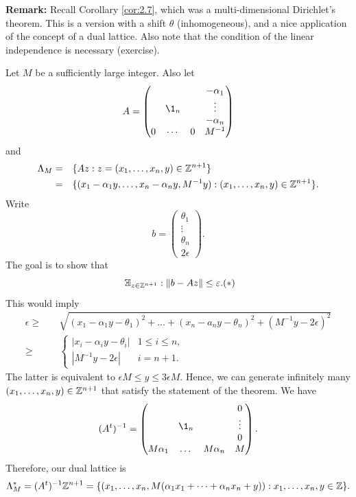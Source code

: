 \documentclass{Vorlesungstemplate_English} %
\begin{document}
\noindent \textbf{Remark:} Recall Corollary \ref{cor:2.7}, which was a multi-dimensional Dirichlet's theorem. This is a version with a shift $\theta$ (inhomogeneous), and a nice application of the concept of a dual lattice. Also note that the condition of the linear independence is necessary (exercise).
\begin{pf}
  Let $M$ be a sufficiently large integer. Also let
  \[ A = \begin{pmatrix}
    & & & -\alpha_1 \\
    & \1_n & & \vdots \\
    & & & -\alpha_n \\
    0 & \cdots & 0 & M^{-1}
  \end{pmatrix}\]
  and
  \begin{align*} \Lambda_M = \quad & \{ Az: z = (x_1, \dots, x_n,y) \in \mathbb{Z}^{n+1}\} \\
  = \quad & \{ (x_1-\alpha_1y, \dots, x_n-\alpha_ny, M^{-1}y): (x_1, \dots, x_n, y) \in \mathbb{Z}^{n+1}\}.\end{align*}
  Write
  \[ b = \begin{pmatrix}
    \theta_1 \\
    \vdots \\
    \theta_n \\
    2\epsilon
  \end{pmatrix}.\]
  The goal is to show that \[\exists_{z \in \Z^{n+1}}: \|b-Az\| \leq \epsilon. \hfill (*)\]
  This would imply
  \begin{align*} \epsilon \geq \quad & \sqrt{(x_1-\alpha_1y-\theta_1)^2 + \dots + (x_n-a_ny-\theta_n)^2 + (M^{-1}y-2\epsilon)^2} \\
   \geq \quad & \begin{cases}
    |x_i-\alpha_iy-\theta_i| & 1 \leq i \leq n, \\
    |M^{-1}y-2\epsilon| & i=n+1.
  \end{cases}\end{align*}
  The latter is equivalent to $\epsilon M \leq y \leq 3\epsilon M$. Hence, we can generate infinitely many $(x_1, \dots, x_n, y) \in \mathbb{Z}^{n+1}$ that satisfy the statement of the theorem. We have
  \[ (A^t)^{-1} = \begin{pmatrix}
    & & & 0 \\
    & \1_n & & \vdots \\
    & & & 0 \\
    M\alpha_1 & \dots & M\alpha_n & M
  \end{pmatrix}.\]
  Therefore, our dual lattice is
  \[ \Lambda_M^* = (A^t)^{-1}\mathbb{Z}^{n+1} = \{ (x_1, \dots, x_n, M(\alpha_1x_1+\dots+\alpha_nx_n+y)): x_1, \dots, x_n,y \in \mathbb{Z}\}.\]

\end{pf}
\end{document}
